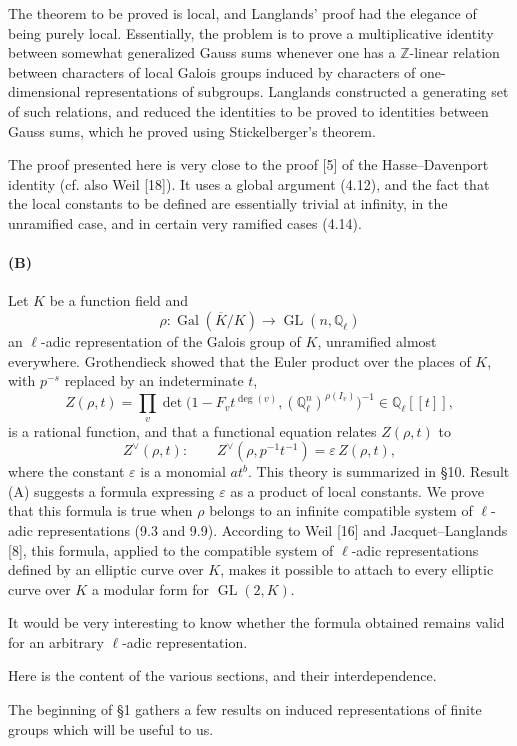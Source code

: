 \documentclass[10pt]{article}
\newcommand{\Q}{\mathbb Q}
\newcommand{\Z}{\mathbb Z}
\newcommand{\Gal}{\operatorname{Gal}}
\newcommand{\GL}{\operatorname{GL}}
\begin{document}
The theorem to be proved is local, and Langlands' proof had the elegance of being purely local. Essentially, the problem is to prove a multiplicative identity between somewhat generalized Gauss sums whenever one has a \(\Z\)-linear relation between characters of local Galois groups induced by characters of one-dimensional representations of subgroups. Langlands constructed a generating set of such relations, and reduced the identities to be proved to identities between Gauss sums, which he proved using Stickelberger's theorem.

The proof presented here is very close to the proof [5] of the Hasse--Davenport identity (cf. also Weil [18]). It uses a global argument (4.12), and the fact that the local constants to be defined are essentially trivial at infinity, in the unramified case, and in certain very ramified cases (4.14).

\paragraph{(B)} Let \(K\) be a function field and
\[
\rho:\Gal(\overline K/K)\longrightarrow \GL(n,\Q_\ell)
\]
an \(\ell\)-adic representation of the Galois group of \(K\), unramified almost everywhere. Grothendieck showed that the Euler product over the places of \(K\), with \(p^{-s}\) replaced by an indeterminate \(t\),
\[
Z(\rho,t)=\prod_v\det\bigl(1-F_vt^{\deg(v)},(\Q_\ell^n)^{\rho(I_v)}\bigr)^{-1}
\in\Q_\ell[[t]],
\]
is a rational function, and that a functional equation relates \(Z(\rho,t)\) to
\[
Z^\vee(\rho,t):
\qquad
Z^\vee(\rho,p^{-1}t^{-1})=\varepsilon\, Z(\rho,t),
\]
where the constant \(\varepsilon\) is a monomial \(at^b\). This theory is summarized in §10. Result (A) suggests a formula expressing \(\varepsilon\) as a product of local constants. We prove that this formula is true when \(\rho\) belongs to an infinite compatible system of \(\ell\)-adic representations (9.3 and 9.9). According to Weil [16] and Jacquet--Langlands [8], this formula, applied to the compatible system of \(\ell\)-adic representations defined by an elliptic curve over \(K\), makes it possible to attach to every elliptic curve over \(K\) a modular form for \(\GL(2,K)\).

It would be very interesting to know whether the formula obtained remains valid for an arbitrary \(\ell\)-adic representation.

Here is the content of the various sections, and their interdependence.

The beginning of §1 gathers a few results on induced representations of finite groups which will be useful to us.
\end{document}
